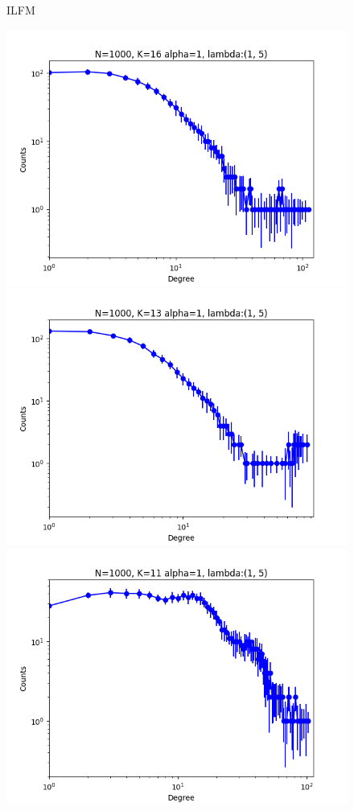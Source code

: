\documentclass[a4paper, 12pt]{article}
\begin{document}
\begin{figure}[ht]
    \vspace{0.2cm}
	 ILFM

	\includegraphics[scale=0.27]{img/expe/1_ibp/figure_1}
	\endminipage
	\includegraphics[scale=0.27]{img/expe/2_ibp/figure_1}
	\endminipage
	\includegraphics[scale=0.27]{img/expe/3_ibp/figure_1}

\end{figure}
\end{document}
